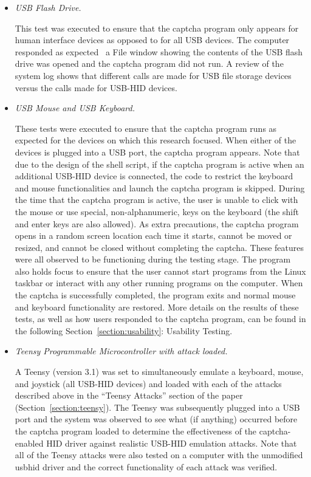 \documentclass[pagenumbers]{ieee}
\begin{document}
\begin{itemize}
\item \textit{USB Flash Drive.}

This test was executed to ensure that the captcha program only appears for human interface devices as opposed to for all USB devices. The computer responded as expected \textemdash \ a File window showing the contents of the USB flash drive was opened and the captcha program did not run. A review of the system log shows that different calls are made for USB file storage devices versus the calls made for USB-HID devices.

\item \textit{USB Mouse and USB Keyboard.}

These tests were executed to ensure that the captcha program runs as expected for the devices on which this research focused. When either of the devices is plugged into a USB port, the captcha program appears. Note that due to the design of the shell script, if the captcha program is active when an additional USB-HID device is connected, the code to restrict the keyboard and mouse functionalities and launch the captcha program is skipped. During the time that the captcha program is active, the user is unable to click with the mouse or use special, non-alphanumeric, keys on the keyboard (the shift and enter keys are also allowed). As extra precautions, the captcha program opens in a random screen location each time it starts, cannot be moved or resized, and cannot be closed without completing the captcha. These features were all observed to be functioning during the testing stage. The program also holds focus to ensure that the user cannot start programs from the Linux taskbar or interact with any other running programs on the computer. When the captcha is successfully completed, the program exits and normal mouse and keyboard functionality are restored. More details on the results of these tests, as well as how users responded to the captcha program, can be found in the following Section~\ref{section:usability}: Usability Testing.

\item \textit{Teensy Programmable Microcontroller with attack loaded.}

A Teensy (version 3.1) was set to simultaneously emulate a keyboard, mouse, and joystick (all USB-HID devices) and loaded with each of the attacks described above in the ``Teensy Attacks'' section of the paper (Section~\ref{section:teensy}). The Teensy was subsequently plugged into a USB port and the system was observed to see what (if anything) occurred before the captcha program loaded to determine the effectiveness of the captcha-enabled HID driver against realistic USB-HID emulation attacks. Note that all of the Teensy attacks were also tested on a computer with the unmodified usbhid driver and the correct functionality of each attack was verified.


\end{itemize}
\end{document}
